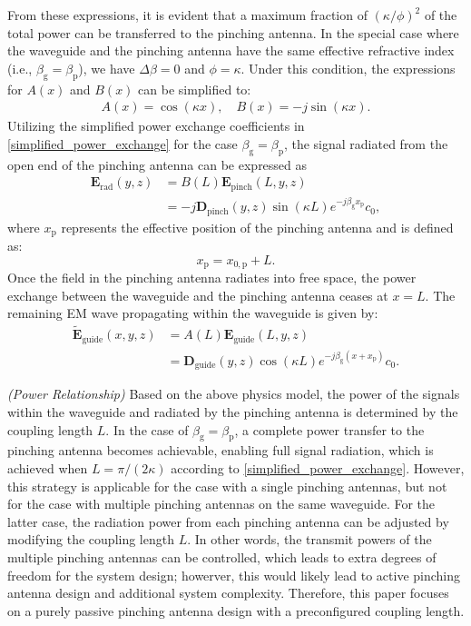 From these expressions, it is evident that a maximum fraction of $\left( \kappa/\phi \right)^2$ of the total power can be transferred to the pinching antenna. In the special case where the waveguide and the pinching antenna have the same effective refractive index (i.e., $\beta_{\mathrm{g}} = \beta_{\mathrm{p}}$), we have $\Delta \beta = 0$ and $\phi = \kappa$. Under this condition, the expressions for $A(x)$ and $B(x)$ can be simplified to:
\begin{align} \label{simplified_power_exchange}
    A(x) = \cos(\kappa x), \quad B(x) = -j \sin(\kappa x).
\end{align}
Utilizing the simplified power exchange coefficients in \eqref{simplified_power_exchange} for the case $\beta_{\mathrm{g}} = \beta_{\mathrm{p}}$, the signal radiated from the open end of the pinching antenna can be expressed as
\begin{align} \label{EM_model_rad}
    \mathbf{E}_{\mathrm{rad}}(y,z) &=  B(L) \mathbf{E}_{\mathrm{pinch}}(L,y,z) \nonumber \\
    &= -j \mathbf{D}_{\mathrm{pinch}}(y,z) \sin(\kappa L) e^{-j \beta_{\mathrm{g}} x_{\mathrm{p}}} c_0,
\end{align}
where $x_{\mathrm{p}}$ represents the effective position of the pinching antenna and is defined as:
\begin{equation}
    x_{\mathrm{p}} = x_{0, \mathrm{p}} + L.
\end{equation}
Once the field in the pinching antenna radiates into free space, the power exchange between the waveguide and the pinching antenna ceases at $x = L$. The remaining EM wave propagating within the waveguide is given by:
\begin{align} \label{EM_model_guide_remain}
    \tilde{\mathbf{E}}_{\mathrm{guide}}(x,y,z) &= A(L) \mathbf{E}_{\mathrm{guide}}(L,y,z) \nonumber \\
    &= \mathbf{D}_{\mathrm{guide}}(y,z) \cos(\kappa L) e^{-j \beta_{\mathrm{g}} (x + x_{\mathrm{p}})} c_0.
\end{align}

\begin{remark}
    \normalfont
    \emph{(Power Relationship)} Based on the above physics model, the power of the signals within the waveguide and radiated by the pinching antenna is determined by the coupling length $L$. In the case of $\beta_{\mathrm{g}} = \beta_{\mathrm{p}}$, a complete power transfer to the pinching antenna becomes achievable, enabling full signal radiation, which is achieved when $L = \pi/(2\kappa)$ according to \eqref{simplified_power_exchange}. However, this strategy is applicable for the case with a single pinching antennas, but not for the case with multiple pinching antennas on the same waveguide. For the latter case, the radiation power from each pinching antenna can be adjusted by modifying the coupling length $L$. In other words, the transmit powers of the multiple pinching antennas can be controlled, which leads to extra degrees of freedom for the system design; howerver, this would likely lead to active pinching antenna design and additional system complexity. Therefore, this paper focuses on a purely passive pinching antenna design with a preconfigured coupling length.
\end{remark}

